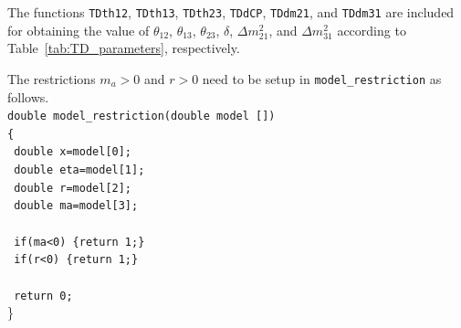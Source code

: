 \documentclass[aps,prd,nofootinbib,preprint]{revtex4}
\begin{document}


The functions \texttt{TDth12}, \texttt{TDth13}, \texttt{TDth23}, \texttt{TDdCP}, \texttt{TDdm21}, and \texttt{TDdm31} are included for obtaining the value of $\theta_{12}$, $\theta_{13}$, $\theta_{23}$, $\delta$, $\Delta m_{21}^2$, and $\Delta m_{31}^2$ according to Table~\ref{tab:TD_parameters}, respectively.

The restrictions $m_a>0$ and $r>0$ need to be setup in \texttt{model\_restriction} as follows.\vspace{0.2cm}\\
\texttt{double model\_restriction(double model [])}\\
\texttt{\{}\\
\texttt{    double x=model[0];}\\
\texttt{    double eta=model[1];}\\
\texttt{    double r=model[2];}\\
\texttt{    double ma=model[3];}\\
    \\
\texttt{    if(ma<0) \{return 1;\}}\\
\texttt{    if(r<0) \{return 1;\}}\\
\\ 
\texttt{    return 0;}\\
\}\vspace{0.2cm}\\
\end{document}
